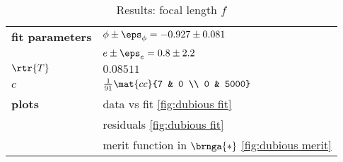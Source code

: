 \begin{table}[t]
	\begin{center}
		\begin{tabular}{ll}
		  \bf{fit parameters} & $\phi\pm\eps_{\phi} = -0.927\pm0.081$ \\
		                      & $e\pm\eps_{e} = 0.8\pm2.2$ \\[5pt]
		  $\rtr{T}$ & $0.08511$\\[5pt]
		  $c$ & $\frac{1}{91} \mat{cc}{7 & 0 \\ 0 & 5000}$\\[8pt]
		  \bf{plots} & data vs fit \eqref{fig:dubious fit} \\
		             & residuals \eqref{fig:dubious fit} \\
		             & merit function in $\brnga{*}$ \eqref{fig:dubious merit} \\[5pt]
		\end{tabular}
	\end{center}
	\label{tab:results dubious}
	\caption{Results: focal length $f$}
\end{table}%

\endinput  %

